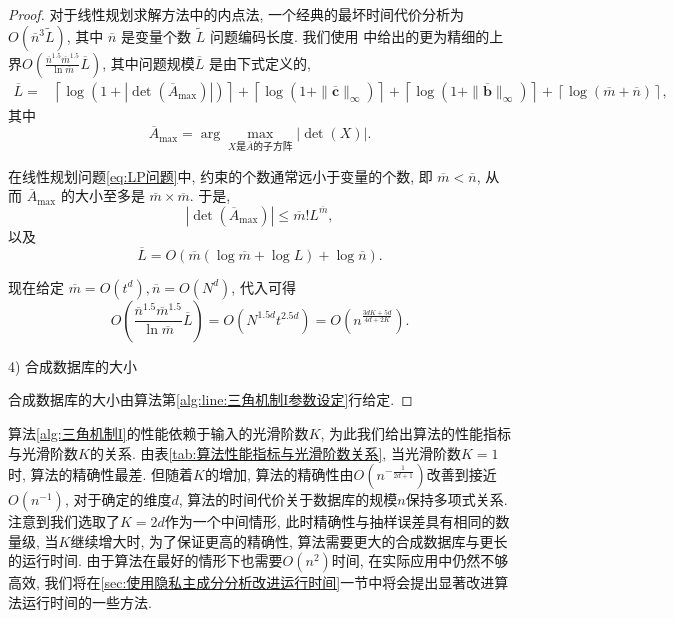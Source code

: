 \begin{proof}
对于线性规划求解方法中的内点法, 一个经典的最坏时间代价分析为 $O(\overline{n}^3 \tilde {L})$, 其中 $\overline n$ 是变量个数 $\tilde L$ 问题编码长度. 我们使用 \parencite{Anstreicher:1999} 中给出的更为精细的上界$O(\frac{\overline{n}^{1.5}\overline{m}^{1.5}}{\ln \overline{m}}
\overline{L})$, 其中问题规模$\overline{L}$ 是由下式定义的\parencite{Monteiro:1989},
\begin{align*}
  \overline{L} = &\left\lceil\log(1+|\det(\overline{A}_{\mathrm{max}})|)\right\rceil
  + \left\lceil\log(1+\|\overline{\mathbf{c}}\|_{\infty})\right\rceil  +\left\lceil\log(1+\|\overline{\mathbf{b}}\|_{\infty})\right\rceil
  + \left\lceil\log(\overline{m}+\overline{n})\right\rceil,
\end{align*}
其中
\begin{equation*}
  \overline{A}_{\mathrm{max}} = \arg\max_{\text{$X$是$\overline{A}$的子方阵}} \left|\det(X)\right|.
\end{equation*}

在线性规划问题\eqref{eq:LP问题}中, 约束的个数通常远小于变量的个数, 
即 $\overline{m}<\overline{n}$, 从而 $\overline{A}_{\mathrm{max}}$ 的大小至多是 $\overline{m}\times\overline{m}$. 于是, 
\[
|\det(\overline{A}_{\mathrm{max}})|\le \overline{m}!L^{\overline{m}},
\]
以及
\[
\overline{L} = O(\overline{m}(\log \overline{m}+ \log L) + \log \overline{n}).
\]

现在给定 $\overline{m} = O\left(t^d\right), \overline{n} = O\left(N^d\right)$, 代入可得
\[
O \left(\frac{\overline{n}^{1.5}\overline{m}^{1.5}}{\ln \overline{m}}\overline{L} \right) = O\left(N^{1.5d}t^{2.5d}\right)
=O \left(n^{\frac{3dK+5d}{4d+2K}}\right).
\]

4) 合成数据库的大小

合成数据库的大小由算法第\ref{alg:line:三角机制I参数设定}行给定.
\end{proof}
算法\ref{alg:三角机制I}的性能依赖于输入的光滑阶数$K$, 为此我们给出算法的性能指标与光滑阶数$K$的关系. 由表\ref{tab:算法性能指标与光滑阶数关系}, 当光滑阶数$K = 1$时, 算法的精确性最差. 但随着$K$的增加, 算法的精确性由$O\left(n^{-\frac{1}{2d+1}}\right)$改善到接近$O(n^{-1})$, 对于确定的维度$d$, 算法的时间代价关于数据库的规模$n$保持多项式关系. 注意到我们选取了$K = 2d$作为一个中间情形, 此时精确性与抽样误差具有相同的数量级, 当$K$继续增大时, 为了保证更高的精确性, 算法需要更大的合成数据库与更长的运行时间. 由于算法在最好的情形下也需要$O(n^2)$时间, 在实际应用中仍然不够高效, 我们将在\ref{sec:使用隐私主成分分析改进运行时间}一节中将会提出显著改进算法运行时间的一些方法. 
\renewcommand{\arraystretch}{1.5}
